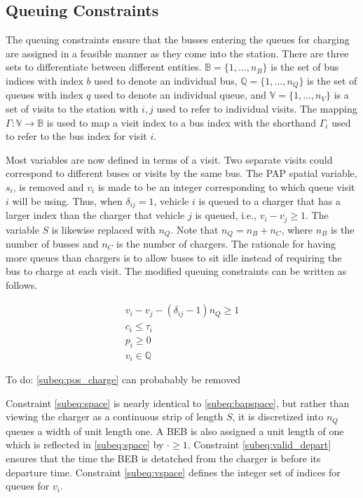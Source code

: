 \documentclass[utf8]{FrontiersinHarvard}
\newcommand{\TODO}[1]{{\color{green} To do: #1}}                                %
\begin{document}
\subsection{Queuing Constraints} \label{sec:queuing}
\noindent
The queuing constraints ensure that the busses entering the queues for charging are assigned in a feasible manner as
they come into the station. There are three sets to differentiate between different entities. $\mathbb{B} = \{1, ...,
n_B\}$ is the set of bus indices with index $b$ used to denote an individual bus, $\mathbb{Q} = \{1, ..., n_Q\}$ is the set of
queues with index $q$ used to denote an individual queue, and $\mathbb{V} = \{1, ..., n_V\}$ is a set of visits to the
station with $i,j$ used to refer to individual visits. The mapping $\Gamma: \mathbb{V} \rightarrow \mathbb{B}$ is used to map a visit
index to a bus index with the shorthand $\Gamma_i$ used to refer to the bus index for visit $i$.

Most variables are now defined in terms of a visit. Two separate visits could correspond to different buses or visits by
the same bus. The PAP spatial variable, $s_i$, is removed and $v_i$ is made to be an integer corresponding to which
queue visit $i$ will be using. Thus, when $\delta_{ij} = 1$, vehicle $i$ is queued to a charger that has a larger index than
the charger that vehicle $j$ is queued, i.e., $v_i-v_j \geq 1$. The variable $S$ is likewise replaced with $n_Q$. Note that
$n_Q = n_B + n_C$, where $n_B$ is the number of busses and $n_C$ is the number of chargers. The rationale for having
more queues than chargers is to allow buses to sit idle instead of requiring the bus to charge at each visit. The
modified queuing constraints can be written as follows.

\begin{subequations}
\label{eq:packconstrs}
\begin{align}
    v_i - v_j - (\delta_{ij} - 1)n_Q \geq 1       \label{subeq:space}        \\
    c_i \leq \tau_i                             \label{subeq:valid_depart} \\
    p_i \geq 0                               \label{subeq:pos_charge} \\
    v_i \in \mathbb{Q}                       \label{subeq:vspace}
\end{align}
\end{subequations}

\TODO{\eqref{subeq:pos_charge} can probabably be removed}

Constraint \eqref{subeq:space} is nearly identical to \eqref{subeq:bapspace}, but rather than viewing the charger as a
continuous strip of length $S$, it is discretized into $n_Q$ queues a width of unit length one. A BEB is also assigned a
unit length of one which is reflected in \eqref{subeq:space} by $\cdot \geq 1$. Constraint \eqref{subeq:valid_depart} ensures
that the time the BEB is detatched from the charger is before its departure time. Constraint \eqref{subeq:vspace}
defines the integer set of indices for queues for $v_i$.
\end{document}

